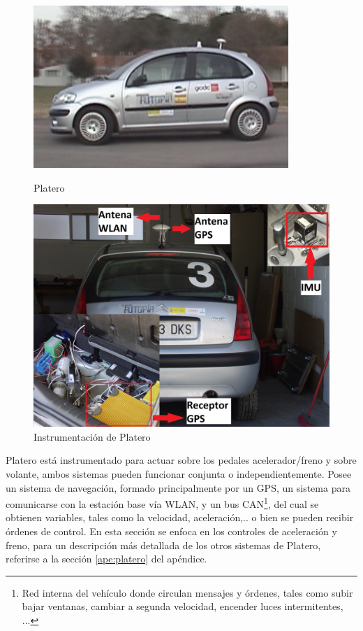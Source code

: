 \begin{figure}[ht]
\begin{minipage}[b]{0.5\linewidth}
\centering
\includegraphics[width=0.9\linewidth]{figures/platero.png}
\caption{Platero}
\label{fig:platero}
\end{minipage}
\begin{minipage}[b]{0.5\linewidth}
\centering
\includegraphics[width=0.9\linewidth]{figures/maletero.jpg}
\caption{Instrumentación de Platero}
\label{fig:maleta}
\end{minipage}
\end{figure} 
Platero está instrumentado para actuar sobre los pedales acelerador/freno y sobre volante, ambos sistemas pueden funcionar conjunta o independientemente. Posee un sistema de navegación, formado principalmente por un \gls{GPS}, un sistema para comunicarse con la estación base vía \gls{WLAN}, y un bus \gls{CAN}\footnote{Red interna del vehículo donde circulan mensajes y órdenes, tales como subir bajar ventanas, cambiar a segunda velocidad, encender luces intermitentes, ...}, del cual se obtienen variables, tales como la velocidad, aceleración,.. o bien se pueden recibir órdenes de control. En esta sección se enfoca en los controles de aceleración y freno, para un descripción más detallada de los otros sistemas de Platero, referirse a la sección \ref{ape:platero} del apéndice.

